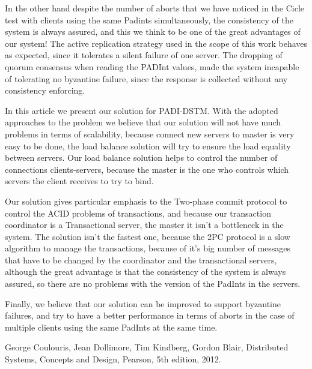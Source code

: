 \documentclass[times, 10pt,twocolumn]{article}
\begin{document}
In the other hand despite the number of aborts that we have noticed in the Cicle test with clients using the same Padints simultaneously, the consistency of the system is always assured, and this we think to be one of the great advantages of our system!
The active replication strategy used in the scope of this work behaves as expected, since it tolerates a silent failure of one server.
The dropping of quorum consensus when reading the PADInt values, made the system incapable of tolerating no byzantine failure, since the response is collected without any consistency enforcing.


In this article we present our solution for PADI-DSTM. With the adopted approaches to the problem we believe that our solution will not have much problems in terms of scalability, because connect new servers to master is very easy to be done, the load balance solution will try to ensure the load equality between servers. Our load balance solution helps to control the number of connections clients-servers, because the master is the one who controls which servers the client receives to try to bind.

Our solution gives particular emphasis to the Two-phase commit protocol to control the ACID problems of transactions, and because our transaction coordinator is a Transactional server, the master it isn't a bottleneck in the system. The solution isn't the fastest one, because the 2PC protocol is a slow algorithm to manage the transactions, because of it's big number of messages that have to be changed by the coordinator and the transactional servers, although the great advantage is that the consistency of the system is always assured, so there are no problems with the version of the PadInts in the servers. 

Finally, we believe that our solution can be improved to support byzantine failures, and try to have a better performance in terms of aborts in the case of multiple clients using the same PadInts at the same time.





\begin{thebibliography}{9}
 
George Coulouris, Jean Dollimore, Tim Kindberg, Gordon Blair,
   Distributed Systems, Concepts and Design, 
   Pearson,
   5th edition,
   2012.

\end{thebibliography}
\end{document}
